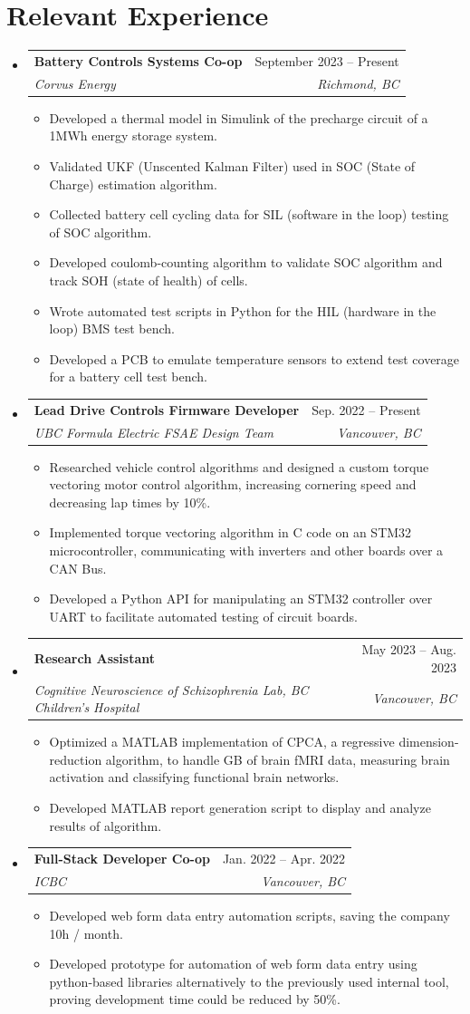 \documentclass[letterpaper,11pt]{article}
\makeatletter
\newcommand{\resumeItem}[1]{
  \item\small{
    {#1 \vspace{-2pt}}
  }
}
\newcommand{\resumeSubheading}[4]{
  \vspace{-2pt}\item
    \begin{tabular*}{0.97\textwidth}[t]{l@{\extracolsep{\fill}}r}
      \textbf{#1} & #2 \\
      \textit{\small#3} & \textit{\small #4} \\
    \end{tabular*}\vspace{-7pt}
}
\newcommand{\resumeSubHeadingListStart}{\begin{itemize}[leftmargin=0.15in, label={}]}
\newcommand{\resumeSubHeadingListEnd}{\end{itemize}}
\newcommand{\resumeItemListStart}{\begin{itemize}}
\newcommand{\resumeItemListEnd}{\end{itemize}\vspace{-5pt}}
\makeatother
\begin{document}
\section{Relevant Experience}
  \resumeSubHeadingListStart
    \resumeSubheading
      {Battery Controls Systems Co-op}{September 2023 -- Present}
      {Corvus Energy}{Richmond, BC}
      \resumeItemListStart
        \resumeItem{Developed a thermal model in Simulink of the precharge circuit of a 1MWh energy storage system.}
        \resumeItem{Validated UKF (Unscented Kalman Filter) used in SOC (State of Charge) estimation algorithm.}
        \resumeItem{Collected battery cell cycling data for SIL (software in the loop) testing of SOC algorithm.} 
        \resumeItem{Developed coulomb-counting algorithm to validate SOC algorithm and track SOH (state of health) of cells.}
        \resumeItem{Wrote automated test scripts in Python for the HIL (hardware in the loop) BMS test bench.}
        \resumeItem{Developed a PCB to emulate temperature sensors to extend test coverage for a battery cell test bench.}
      \resumeItemListEnd
  \resumeSubheading
      {Lead Drive Controls Firmware Developer}{Sep. 2022 -- Present}
      {UBC Formula Electric FSAE Design Team}{Vancouver, BC}
      \resumeItemListStart
        \resumeItem{Researched vehicle control algorithms and designed a custom torque vectoring motor control algorithm, increasing cornering speed and decreasing lap times by 10\%.}
        \resumeItem{Implemented torque vectoring algorithm in C code on an STM32 microcontroller, communicating with inverters and other boards over a CAN Bus.}
        \resumeItem{Developed a Python API for manipulating an STM32 controller over UART to facilitate automated testing of circuit boards.}
      \resumeItemListEnd
    \resumeSubheading
      {Research Assistant}{May 2023 -- Aug. 2023}
      {Cognitive Neuroscience of Schizophrenia Lab, BC Children's Hospital}{Vancouver, BC}
      \resumeItemListStart
        \resumeItem{Optimized a MATLAB implementation of CPCA, a regressive dimension-reduction algorithm, to handle GB of brain fMRI data, measuring brain activation and classifying functional brain networks.}
        \resumeItem{Developed MATLAB report generation script to display and analyze results of algorithm. }
      \resumeItemListEnd
  \resumeSubheading
      {Full-Stack Developer Co-op}{Jan. 2022 -- Apr. 2022}
      {ICBC}{Vancouver, BC}
      \resumeItemListStart
        \resumeItem{Developed web form data entry automation scripts, saving the company 10h / month.}
        \resumeItem{Developed prototype for automation of web form data entry using python-based libraries alternatively to the previously used internal tool, 
        proving development time could be reduced by 50\%.}
      \resumeItemListEnd
  \resumeSubHeadingListEnd
\end{document}
